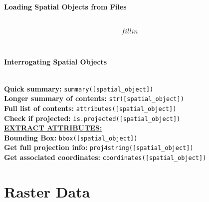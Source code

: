 \documentclass[10pt]{article}
\begin{document}
\hrulefill \\ 
\centerline{\textbf{Loading Spatial Objects from Files}} \\

\[ fill in \]

\hrulefill \\ 
\centerline{\textbf{Interrogating Spatial Objects}} \\
\textbf{Quick summary:} \texttt{summary([spatial\_object])}\\
\textbf{Longer summary of contents:} \texttt{str([spatial\_object])}\\
\textbf{Full list of contents:} \texttt{attributes([spatial\_object])}\\
\textbf{Check if projected:} \texttt{is.projected([spatial\_object])}\\

\underline{\textbf{EXTRACT ATTRIBUTES:} }\\
\textbf{Bounding Box:} \texttt{bbox([spatial\_object])}\\
\textbf{Get full projection info:} \texttt{proj4string([spatial\_object])}\\
\textbf{Get associated coordinates:} \texttt{coordinates([spatial\_object])}\\


\section*{Raster Data}

\end{document}
